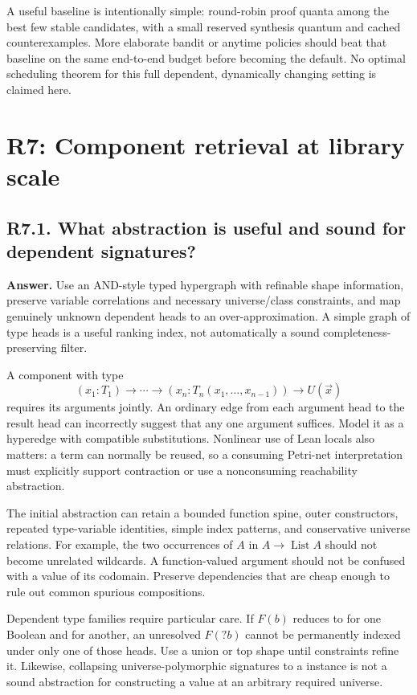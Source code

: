 \documentclass[11pt,a4paper]{article}
\newcommand{\code}[1]{\texttt{\detokenize{#1}}}
\newcommand{\question}[2]{\subsection{#1. #2}\label{q:#1}}
\newcommand{\List}{\operatorname{List}}
\theoremstyle{definition}
\theoremstyle{remark}
\begin{document}
A useful baseline is intentionally simple: round-robin proof quanta among the best few stable candidates, with a small reserved synthesis quantum and cached counterexamples. More elaborate bandit or anytime policies should beat that baseline on the same end-to-end budget before becoming the default. No optimal scheduling theorem for this full dependent, dynamically changing setting is claimed here.

\section{R7: Component retrieval at library scale}\label{sec:r7}

\question{R7.1}{What abstraction is useful and sound for dependent signatures?}

\textbf{Answer.} Use an AND-style typed hypergraph with refinable shape information, preserve variable correlations and necessary universe/class constraints, and map genuinely unknown dependent heads to an over-approximation. A simple graph of type heads is a useful ranking index, not automatically a sound completeness-preserving filter.

A component with type
\[
 (x_1:T_1)\to\cdots\to(x_n:T_n(x_1,\ldots,x_{n-1}))\to U(\vec x)
\]
requires its arguments jointly. An ordinary edge from each argument head to the result head can incorrectly suggest that any one argument suffices. Model it as a hyperedge with compatible substitutions. Nonlinear use of Lean locals also matters: a term can normally be reused, so a consuming Petri-net interpretation must explicitly support contraction or use a nonconsuming reachability abstraction.

The initial abstraction can retain a bounded function spine, outer constructors, repeated type-variable identities, simple index patterns, and conservative universe relations. For example, the two occurrences of $A$ in $A\to\List A$ should not become unrelated wildcards. A function-valued argument should not be confused with a value of its codomain. Preserve dependencies that are cheap enough to rule out common spurious compositions.

Dependent type families require particular care. If $F(b)$ reduces to \code{Nat} for one Boolean and \code{Bool} for another, an unresolved $F(\mathord{?}b)$ cannot be permanently indexed under only one of those heads. Use a union or top shape until constraints refine it. Likewise, collapsing universe-polymorphic signatures to a \code{Prop} instance is not a sound abstraction for constructing a value at an arbitrary required universe.
\end{document}
